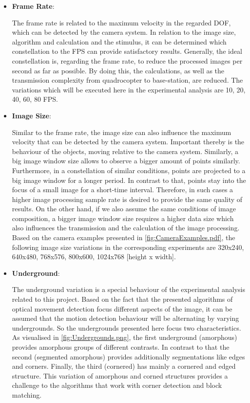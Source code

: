 \begin{itemize}

\item \textbf{Frame Rate}:

The frame rate is related to the maximum velocity in the regarded \gls{DOF}, which can be detected by the camera system.
 In relation to the image size, algorithm and calculation and the stimulus, it can be determined which constellation to the \gls{FPS} can provide satisfactory results. Generally, the ideal constellation is, regarding the frame rate, to reduce the processed images per second as far as possible. By doing this, the calculations, as well as the transmission complexity from quadrocopter to base-station, are reduced.
The variations which will be executed here in the experimental analysis are 10, 20, 40, 60, 80 FPS.

\item \textbf{Image Size}:
 
Similar to the frame rate, the image size can also influence the maximum velocity that can be detected by the camera system. Important thereby is the behaviour of the objects, moving relative to the camera system. Similarly, a big image window size allows to observe a bigger amount of points similarly. Furthermore, in a constellation of similar conditions, points are projected to a big image window for a longer period. In contrast to that, points stay into the focus of a small image for a short-time interval. Therefore, in such cases a higher image processing sample rate is desired to provide the same quality of results. On the other hand, if we also assume the same conditions of image composition, a bigger image window size requires a higher data size which also influences the transmission and the calculation of the image processing. Based on the camera examples presented in \ref{fig:CameraExamples.pdf}, the following image size variations in the corresponding experiments are 
320x240, 640x480, 768x576, 800x600, 1024x768 [height x width]. 

\item \textbf{Underground}:

The underground variation is a special behaviour of the experimental analysis related to this project. Based on the fact that the presented algorithms of optical movement detection focus different aspects of the image, it can be assumed that the motion detection behaviour will be alternating by varying undergrounds. So the undergrounds presented here focus two characteristics. As visualised in 
\ref{fig:Undergrounds.png}, the first underground (amorphous) provides amorphous groups of different contrasts. In contrast to that the second 
(segmented amorphous) provides additionally segmentations like edges and corners. Finally, the third (cornered) has mainly a cornered and edged structure. This variation of amorphous and corned structures provides a challenge to the algorithms that work with corner detection and block matching. 

\end{itemize}

